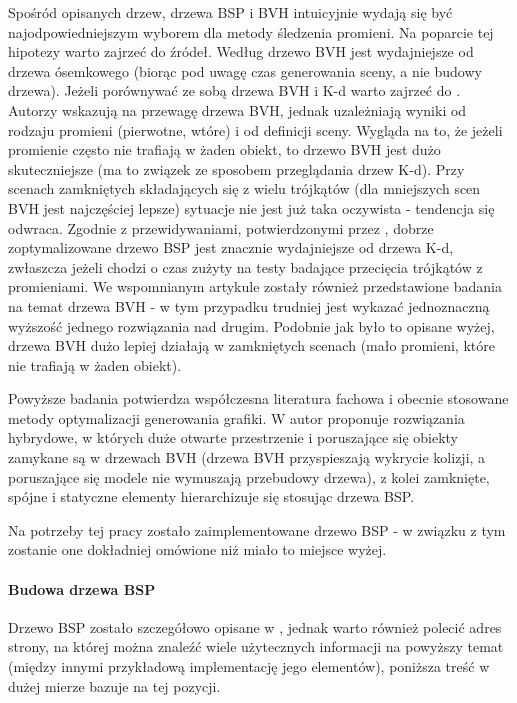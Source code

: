 Spośród opisanych drzew, drzewa BSP i BVH intuicyjnie wydają się być najodpowiedniejszym wyborem dla metody śledzenia promieni. Na poparcie tej hipotezy warto zajrzeć do źródeł. Według \cite{bvhvsoctee} drzewo BVH jest wydajniejsze od drzewa ósemkowego (biorąc pod uwagę czas generowania sceny, a nie budowy drzewa). Jeżeli porównywać ze sobą drzewa BVH i K-d warto zajrzeć do \cite{bvhvskd1, bvhvskd2}. Autorzy wskazują na przewagę drzewa BVH, jednak uzależniają wyniki od rodzaju promieni (pierwotne, wtóre) i od definicji sceny. Wygląda na to, że jeżeli promienie często nie trafiają w żaden obiekt, to drzewo BVH jest dużo skuteczniejsze (ma to związek ze sposobem przeglądania drzew K-d). Przy scenach zamkniętych składających się z wielu trójkątów (dla mniejszych scen BVH jest najczęściej lepsze) sytuacje nie jest już taka oczywista - tendencja się odwraca. Zgodnie z przewidywaniami, potwierdzonymi przez \cite{bspvskd}, dobrze zoptymalizowane drzewo BSP jest znacznie wydajniejsze od drzewa K-d, zwłaszcza jeżeli chodzi o czas zużyty na testy badające przecięcia trójkątów z promieniami. We wspomnianym artykule zostały również przedstawione badania na temat drzewa BVH - w tym przypadku trudniej jest wykazać jednoznaczną wyższość jednego rozwiązania nad drugim. Podobnie jak było to opisane wyżej, drzewa BVH dużo lepiej działają w zamkniętych scenach (mało promieni, które nie trafiają w żaden obiekt). 

Powyższe badania potwierdza współczesna literatura fachowa i obecnie stosowane metody optymalizacji generowania grafiki. W \cite{trees} autor proponuje rozwiązania hybrydowe, w których duże otwarte przestrzenie i poruszające się obiekty zamykane są w drzewach BVH (drzewa BVH przyspieszają wykrycie kolizji, a poruszające się modele nie wymuszają przebudowy drzewa), z kolei zamknięte, spójne i statyczne elementy hierarchizuje się stosując drzewa BSP.

Na potrzeby tej pracy zostało zaimplementowane drzewo BSP - w związku z tym zostanie one dokładniej omówione niż miało to miejsce wyżej.

\paragraph{Budowa drzewa BSP}

Drzewo BSP zostało szczegółowo opisane w \cite{trees}, jednak warto również polecić adres strony\cite{bspfaq}, na której można znaleźć wiele użytecznych informacji na powyższy temat (między innymi przykładową implementację jego elementów), poniższa treść w dużej mierze bazuje na tej pozycji.

